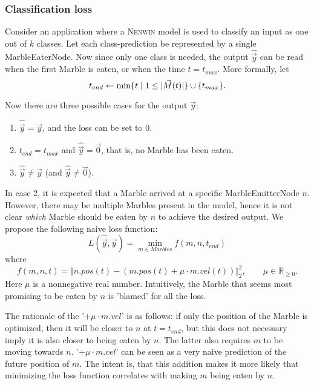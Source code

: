\subsubsection{Classification loss}
Consider an application where a \textsc{Nenwin} model is used to classify an input as one out of $k$ classes. Let each class-prediction be represented by a single MarbleEaterNode. Now since only one class is needed, the output $\hat{\vec{y}}$ can be read when the first Marble is eaten, or when the time $t = t_{max}$. More formally, let 
\begin{equation}
    t_{end} \leftarrow \min \{t \; | \; 1 \leq \lvert \vec{M}(t) \rvert\}\cup \{t_{max}\}.
\end{equation}
Now there are three possible cases for the output $\hat{\vec{y}}$:
\begin{enumerate}
    \item $\hat{\vec{y}} = \vec{y}$, and the loss can be set to 0.
    \item $t_{end} = t_{max}$ and $\hat{\vec{y}} = \vec{0}$, that is, no Marble has been eaten.
    \item $\hat{\vec{y}} \neq \vec{y}$ (and $\hat{\vec{y}} \neq \vec{0}$).
\end{enumerate}

In case 2, it is expected that a Marble arrived at a specific MarbleEmitterNode $n$. However, there may be multiple Marbles present in the model, hence it is not clear \textit{which} Marble should be eaten by $n$ to achieve the desired output. We propose the following naive loss function:
\begin{equation}
    L(\hat{\vec{y}}, \vec{y}) = \min_{m \in Marbles} f(m, n, t_{end}) \label{eq:classification_loss_net}
\end{equation}
where
\begin{equation}
    f(m, n, t) = \big\Vert{n.pos(t) - (m.pos(t) + \mu \cdot m.vel(t))}\big\Vert_2^2, \qquad \mu \in \mathbb{R}_{\geq 0}. \label{eq:classification_loss_one_marble}
\end{equation}
Here $\mu$ is a nonnegative real number. Intuitively, the Marble that seems most promising to be eaten by $n$ is 'blamed' for all the loss.

The rationale of the '$+ \mu \cdot m.vel$' is as follows: if only the position of the Marble is optimized, then it will be closer to $n$ at $t = t_{end}$, but this does not necessary imply it is also closer to being eaten by $n$. The latter also requires $m$ to be moving towards $n$. '$+ \mu \cdot m.vel$' can be seen as a very naive prediction of the future position of $m$. The intent is, that this addition makes it more likely that minimizing the loss function correlates with making $m$ being eaten by $n$.

